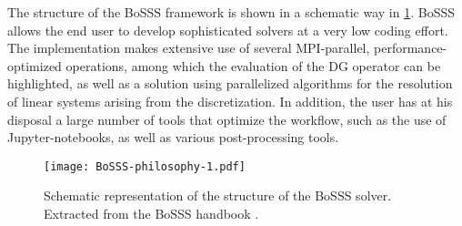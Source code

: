 The structure of the BoSSS framework is shown in a schematic way in \cref{Fig:BoSSS}. BoSSS allows the end user to develop sophisticated solvers at a very low coding effort. The implementation makes extensive use of several \gls{MPI}-parallel, performance-optimized operations, among which the evaluation of the DG operator can be highlighted, as well as a solution using parallelized algorithms for the resolution of linear systems arising from the discretization. In addition, the user has at his disposal a large number of tools that optimize the workflow, such as the use of Jupyter-notebooks, as well as various post-processing tools.
\begin{figure}
	\texttt{[image: BoSSS-philosophy-1.pdf]}
	\caption[Schematic representation of the structure of the BoSSS solver.]{Schematic representation of the structure of the BoSSS solver. Extracted from the BoSSS handbook \parencite{kummer2020}.}
	\label{Fig:BoSSS}
\end{figure}


